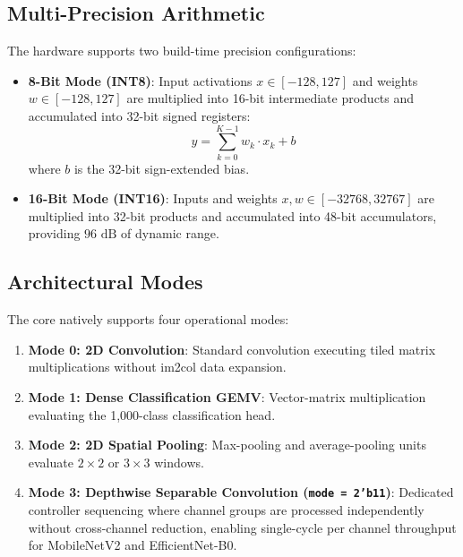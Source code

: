 \documentclass[10pt,journal,compsoc]{IEEEtran}
\begin{document}
\subsection{Multi-Precision Arithmetic}
The hardware supports two build-time precision configurations:
\begin{itemize}
    \item \textbf{8-Bit Mode (INT8)}: Input activations $x \in [-128, 127]$ and weights $w \in [-128, 127]$ are multiplied into 16-bit intermediate products and accumulated into 32-bit signed registers:
    \begin{equation}
    y = \sum_{k=0}^{K-1} w_k \cdot x_k + b
    \end{equation}
    where $b$ is the 32-bit sign-extended bias.
    \item \textbf{16-Bit Mode (INT16)}: Inputs and weights $x, w \in [-32768, 32767]$ are multiplied into 32-bit products and accumulated into 48-bit accumulators, providing $96\text{ dB}$ of dynamic range.
\end{itemize}

\subsection{Architectural Modes}
The core natively supports four operational modes:
\begin{enumerate}
    \item \textbf{Mode 0: 2D Convolution}: Standard convolution executing tiled matrix multiplications without im2col data expansion.
    \item \textbf{Mode 1: Dense Classification GEMV}: Vector-matrix multiplication evaluating the 1,000-class classification head.
    \item \textbf{Mode 2: 2D Spatial Pooling}: Max-pooling and average-pooling units evaluate $2\times2$ or $3\times3$ windows.
    \item \textbf{Mode 3: Depthwise Separable Convolution (\texttt{mode = 2'b11})}: Dedicated controller sequencing where channel groups are processed independently without cross-channel reduction, enabling single-cycle per channel throughput for MobileNetV2 and EfficientNet-B0.
\end{enumerate}
\end{document}
